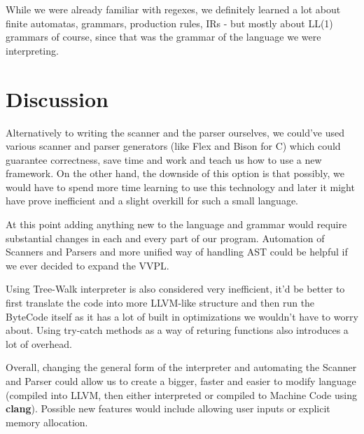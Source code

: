 \documentclass[a4paper,12pt]{article}
\begin{document}
While we were already familiar with regexes, we definitely learned a lot
about finite automatas, grammars, production rules, IRs - but mostly
about LL(1) grammars of course, since that was the grammar of the
language we were interpreting.

\section{Discussion}\label{discussion}

Alternatively to writing the scanner and the parser ourselves, we
could've used various scanner and parser generators (like Flex and Bison
for C) which could guarantee correctness, save time and work and teach
us how to use a new framework. On the other hand, the downside of this
option is that possibly, we would have to spend more time learning to
use this technology and later it might have prove inefficient and a
slight overkill for such a small language. \newline

At this point adding anything new to the language and grammar would
require substantial changes in each and every part of our program.
Automation of Scanners and Parsers and more unified way of handling AST
could be helpful if we ever decided to expand the VVPL. \newline

Using Tree-Walk interpreter is also considered very inefficient, it'd be
better to first translate the code into more LLVM-like structure and
then run the ByteCode itself as it has a lot of built in optimizations
we wouldn't have to worry about. Using try-catch methods as a way of
returing functions also introduces a lot of overhead. \newline

Overall, changing the general form of the interpreter and automating the
Scanner and Parser could allow us to create a bigger, faster and easier
to modify language (compiled into LLVM, then either interpreted or
compiled to Machine Code using \textbf{clang}). Possible new features
would include allowing user inputs or explicit memory allocation.
\end{document}
